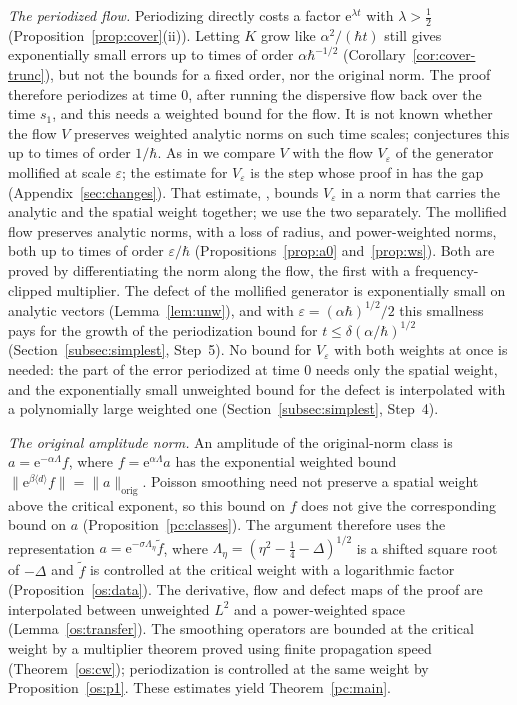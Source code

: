 \documentclass[twoside,10pt]{article}
\numberwithin{equation}{section}
\theoremstyle{slbody}
\theoremstyle{remark}
\newcommand{\norm}[1]{\lVert #1\rVert}
\newcommand{\ue}{\mathrm{e}}
\newcommand{\pcNorm}[1]{\norm{#1}_{\mathrm{orig}}}
\begin{document}
\emph{The periodized flow.} Periodizing directly costs a factor $\ue^{\lambda t}$ with $\lambda>\tfrac12$
(Proposition~\ref{prop:cover}(ii)). Letting $K$ grow like $\alpha^2/(\hbar t)$ still gives exponentially small errors up to times
of order $\alpha\hbar^{-1/2}$ (Corollary~\ref{cor:cover-trunc}), but not the bounds for a fixed order, nor the original norm. The
proof therefore periodizes at time $0$, after running the dispersive flow back over the time $s_1$, and this needs a weighted bound
for the flow. It is not known whether the flow $V$ preserves weighted analytic norms on such time scales; \cite[Conjecture~1]{S}
conjectures this up to times of order $1/\hbar$. As in \cite{S} we compare $V$ with the flow $V_\varepsilon$ of the generator
mollified at scale $\varepsilon$; the estimate for $V_\varepsilon$ is the step whose proof in \cite{S} has the gap
(Appendix~\ref{sec:changes}). That estimate, \cite[Theorem~4.4]{S}, bounds $V_\varepsilon$ in a norm that carries the analytic
and the spatial weight together; we use the two separately. The mollified flow preserves analytic norms, with a loss of radius,
and power-weighted norms, both up to times of order $\varepsilon/\hbar$ (Propositions~\ref{prop:a0} and~\ref{prop:ws}). Both are
proved by differentiating the norm along the flow, the first with a frequency-clipped multiplier. The defect of the mollified
generator is exponentially small on analytic vectors (Lemma~\ref{lem:unw}), and with $\varepsilon=(\alpha\hbar)^{1/2}/2$ this
smallness pays for the growth of the periodization bound for $t\le\delta(\alpha/\hbar)^{1/2}$ (Section~\ref{subsec:simplest},
Step~5). No bound for $V_\varepsilon$ with both weights at once is needed: the part of the error periodized at time $0$ needs only
the spatial weight, and the exponentially small unweighted bound for the defect is interpolated with a polynomially large
weighted one (Section~\ref{subsec:simplest}, Step~4).

\emph{The original amplitude norm.} An amplitude of the original-norm class is $a=\ue^{-\alpha\Lambda}f$,
where $f=\ue^{\alpha\Lambda}a$ has the exponential weighted bound $\norm{\ue^{\beta\langle d\rangle}f}=\pcNorm a$.
Poisson smoothing need not preserve a spatial weight above the critical exponent, so this bound on $f$ does not give the
corresponding bound on $a$ (Proposition~\ref{pc:classes}). The argument therefore uses the representation
$a=\ue^{-\sigma\Lambda_\eta}\tilde f$, where $\Lambda_\eta=(\eta^2-\tfrac14-\Delta)^{1/2}$ is a shifted square root of $-\Delta$ and
$\tilde f$ is controlled at the critical weight with a logarithmic factor (Proposition~\ref{os:data}). The derivative, flow
and defect maps of the proof are interpolated between unweighted $L^2$ and a power-weighted space
(Lemma~\ref{os:transfer}). The smoothing operators are bounded at the critical weight by a
multiplier theorem proved using finite propagation speed (Theorem~\ref{os:cw}); periodization is controlled at the same weight
by Proposition~\ref{os:p1}. These estimates yield Theorem~\ref{pc:main}.
\end{document}
